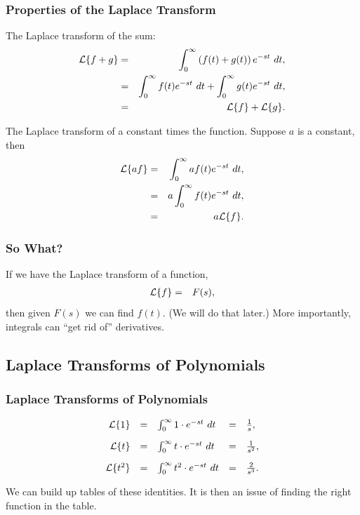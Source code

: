 \begin{frame}
  \frametitle{Properties of the Laplace Transform}

  The Laplace transform of the sum:
  \begin{eqnarray*}
    \laplace{f+g} & = & \int^\infty_0 \lp f(t) + g(t) \rp e^{-st} ~ dt, \\
    & = & \int^\infty_0 f(t) e^{-st} ~ dt + \int^\infty_0 g(t) e^{-st} ~ dt, \\
    & = & \laplace{f} + \laplace{g}.
  \end{eqnarray*}

  
  The Laplace transform of a constant times the function. Suppose $a$ is a constant, then
  \begin{eqnarray*}
    \laplace{a f} & = & \int^\infty_0 a f(t) e^{-st} ~ dt, \\
    & = & a \int^\infty_0 f(t) e^{-st} ~ dt, \\
    & = & a \laplace{f}.
  \end{eqnarray*}


\end{frame}


\begin{frame}
  \frametitle{So What?}

  If we have the Laplace transform of a function, 
  \begin{eqnarray*}
    \laplace{f} & = & F(s),
  \end{eqnarray*}
  then given $F(s)$ we can find $f(t)$. (We will do that later.) More
  importantly, integrals can ``get rid of'' derivatives.

\end{frame}

\subsection{Laplace Transforms of Polynomials}

\begin{frame}
  \frametitle{Laplace Transforms of Polynomials}

  \begin{eqnarray*}
    \begin{array}{rcl@{\hspace{1em}}c@{\hspace{1em}}l}
    \laplace{1} & = & \int^\infty_0 1 \cdot e^{-st} ~ dt
    & = & \frac{1}{s}, \\ [10pt]
    \laplace{t} & = & \int^\infty_0 t \cdot e^{-st} ~ dt
    & = & \frac{1}{s^2}, \\ [10pt]
    \laplace{t^2} & = & \int^\infty_0 t^2 \cdot e^{-st} ~ dt
    & = & \frac{2}{s^3}.      
    \end{array}
  \end{eqnarray*}

  {%
    We can build up tables of these identities. It is then an issue of
    finding the right function in the table.
  }

\end{frame}


